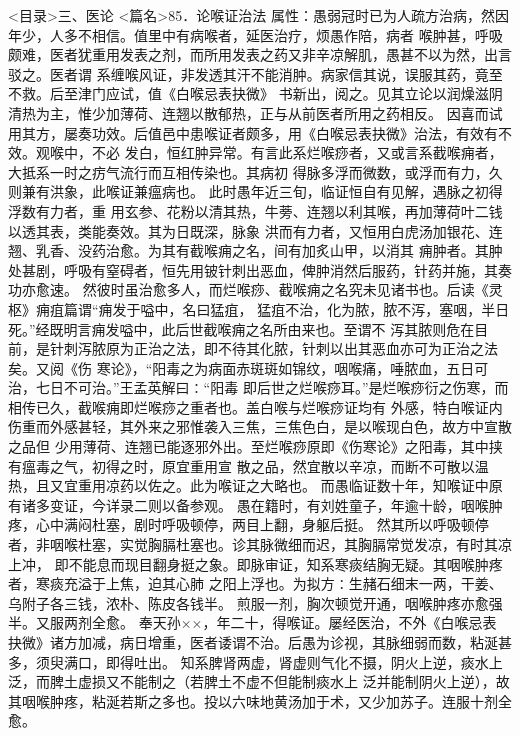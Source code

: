 \documentclass[a4paper,12pt,UTF8,twoside]{ctexbook}
\begin{document}
<目录>三、医论
<篇名>85．论喉证治法
属性：愚弱冠时已为人疏方治病，然因年少，人多不相信。值里中有病喉者，延医治疗，烦愚作陪，病者 
喉肿甚，呼吸颇难，医者犹重用发表之剂，而所用发表之药又非辛凉解肌，愚甚不以为然，出言驳之。医者谓 
系缠喉风证，非发透其汗不能消肿。病家信其说，误服其药，竟至不救。后至津门应试，值《白喉忌表抉微》 
书新出，阅之。见其立论以润燥滋阴清热为主，惟少加薄荷、连翘以散郁热，正与从前医者所用之药相反。 
因喜而试用其方，屡奏功效。后值邑中患喉证者颇多，用《白喉忌表抉微》治法，有效有不效。观喉中，不必 
发白，恒红肿异常。有言此系烂喉痧者，又或言系截喉痈者，大抵系一时之疠气流行而互相传染也。其病初 
得脉多浮而微数，或浮而有力，久则兼有洪象，此喉证兼瘟病也。 
此时愚年近三旬，临证恒自有见解，遇脉之初得浮数有力者，重 
用玄参、花粉以清其热，牛蒡、连翘以利其喉，再加薄荷叶二钱以透其表，类能奏效。其为日既深，脉象 
洪而有力者，又恒用白虎汤加银花、连翘、乳香、没药治愈。为其有截喉痈之名，间有加炙山甲，以消其 
痈肿者。其肿处甚剧，呼吸有窒碍者，恒先用铍针刺出恶血，俾肿消然后服药，针药并施，其奏功亦愈速。 
然彼时虽治愈多人，而烂喉痧、截喉痈之名究未见诸书也。后读《灵枢》痈疽篇谓“痈发于嗌中，名曰猛疽， 
猛疽不治，化为脓，脓不泻，塞咽，半日死。”经既明言痈发嗌中，此后世截喉痈之名所由来也。至谓不 
泻其脓则危在目前，是针刺泻脓原为正治之法，即不待其化脓，针刺以出其恶血亦可为正治之法矣。又阅《伤 
寒论》，“阳毒之为病面赤斑斑如锦纹，咽喉痛，唾脓血，五日可治，七日不可治。”王孟英解曰∶“阳毒 
即后世之烂喉痧耳。”是烂喉痧衍之伤寒，而相传已久，截喉痈即烂喉痧之重者也。盖白喉与烂喉痧证均有 
外感，特白喉证内伤重而外感甚轻，其外来之邪惟袭入三焦，三焦色白，是以喉现白色，故方中宣散之品但 
少用薄荷、连翘已能逐邪外出。至烂喉痧原即《伤寒论》之阳毒，其中挟有瘟毒之气，初得之时，原宜重用宣 
散之品，然宜散以辛凉，而断不可散以温热，且又宜重用凉药以佐之。此为喉证之大略也。 
而愚临证数十年，知喉证中原有诸多变证，今详录二则以备参观。 
愚在籍时，有刘姓童子，年逾十龄，咽喉肿疼，心中满闷杜塞，剧时呼吸顿停，两目上翻，身躯后挺。 
然其所以呼吸顿停者，非咽喉杜塞，实觉胸膈杜塞也。诊其脉微细而迟，其胸膈常觉发凉，有时其凉上冲， 
即不能息而现目翻身挺之象。即脉审证，知系寒痰结胸无疑。其咽喉肿疼者，寒痰充溢于上焦，迫其心肺 
之阳上浮也。为拟方∶生赭石细末一两，干姜、乌附子各三钱，浓朴、陈皮各钱半。 
煎服一剂，胸次顿觉开通，咽喉肿疼亦愈强半。又服两剂全愈。 
奉天孙××，年二十，得喉证。屡经医治，不外《白喉忌表 
抉微》诸方加减，病日增重，医者诿谓不治。后愚为诊视，其脉细弱而数，粘涎甚多，须臾满口，即得吐出。 
知系脾肾两虚，肾虚则气化不摄，阴火上逆，痰水上泛，而脾土虚损又不能制之（若脾土不虚不但能制痰水上 
泛并能制阴火上逆），故其咽喉肿疼，粘涎若斯之多也。投以六味地黄汤加于术，又少加苏子。连服十剂全愈。 
\end{document}
